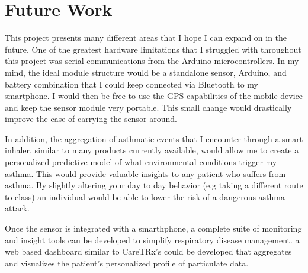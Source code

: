 \documentclass{sigchi}
\begin{document}
\section{Future Work}

This project presents many different areas that I hope I can expand on in the future.
One of the greatest hardware limitations that I struggled with throughout this project
was serial communications from the Arduino microcontrollers. In my mind, the ideal
module structure would be a standalone sensor, Arduino, and battery combination that
I could keep connected via Bluetooth to my smartphone. I would then be free to use the
GPS capabilities of the mobile device and keep the sensor module very portable. This small
change would drastically improve the ease of carrying the sensor around.

In addition, the aggregation of asthmatic events that I encounter through a smart
inhaler, similar to many products currently available, would allow me to create a
personalized predictive model of what environmental conditions trigger my asthma.
This would provide valuable insights to any patient who suffers from asthma.
By slightly altering your day to day behavior (e.g taking a different route to class)
an individual would be able to lower the risk of a dangerous asthma attack.

Once the sensor is integrated with a smarthphone, a complete suite of monitoring
and insight tools can be developed to simplify respiratory disease management. a
web based dashboard similar to CareTRx's could be developed that aggregates and
visualizes the patient's personalized profile of particulate data. \cite{caretrx}


%
%
%
%
%

\balance{}



\end{document}
